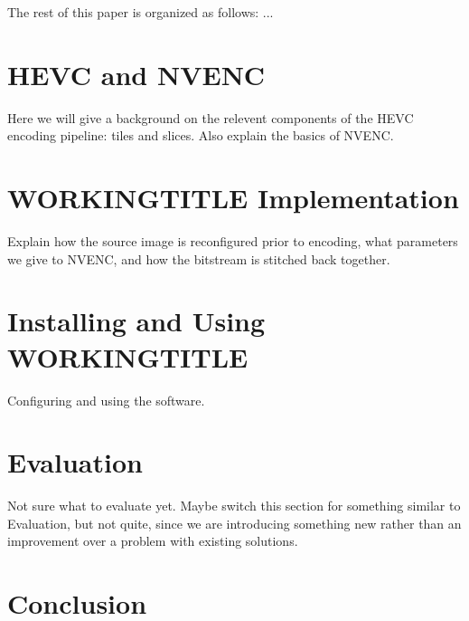 The rest of this paper is organized as follows: ...

\section{HEVC and NVENC}
Here we will give a background on the relevent components of the HEVC encoding pipeline: tiles and slices. Also explain the basics of NVENC.

\section{WORKINGTITLE Implementation}
Explain how the source image is reconfigured prior to encoding, what parameters we give to NVENC, and how the bitstream is stitched back together. 

\section{Installing and Using WORKINGTITLE}
Configuring and using the software.

\section{Evaluation}
Not sure what to evaluate yet. Maybe switch this section for something similar to Evaluation, but not quite, since we are introducing something new rather than an improvement over a problem with existing solutions.

\section{Conclusion}